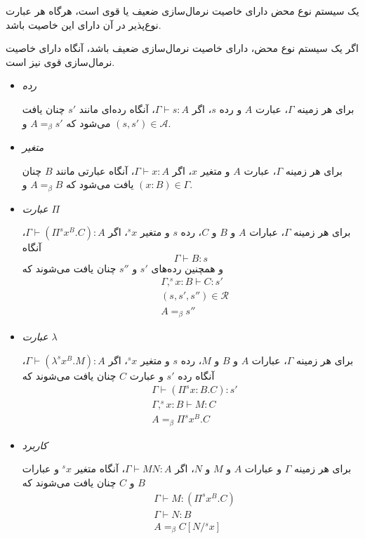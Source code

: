 \begin{defn}
یک سیستم نوع محض دارای خاصیت نرمال‌سازی ضعیف یا قوی است، هرگاه هر عبارت نوع‌پذیر در آن دارای این خاصیت باشد.
\end{defn}

\begin{conj}[\lr{BGK}]\label{BGK}
اگر یک سیستم نوع محض، دارای خاصیت نرمال‌سازی ضعیف باشد، آنگاه دارای خاصیت نرمال‌سازی قوی نیز است.
\end{conj}

\begin{lmm}\label{generation}
\hfill
\begin{itemize}

\item \emph{رده}

برای هر زمینه
$\Gamma$،
عبارت
$A$
و رده
$s$،
اگر
$\Gamma \vdash s : A$،
آنگاه رده‌ای مانند
$s'$
چنان یافت می‌شود که
$A =_\beta s'$
و
$(s,s') \in \mathcal{A}$.

\item \emph{متغیر}

برای هر زمینه
$\Gamma$،
عبارت
$A$
و متغیر
$x$، اگر
$\Gamma \vdash x : A$،
آنگاه عبارتی مانند
$B$
چنان یافت می‌شود که
$A =_\beta B$
و
$(x:B) \in \Gamma$.

\item \emph{عبارت $\Pi$}

برای هر زمینه
$\Gamma$،
عبارات
$A$ و $B$ و $C$،
رده
$s$
و متغیر
${}^sx$،
اگر
$\Gamma \vdash (\Pi ^sx^B.C):A$،
آنگاه
\begin{equation*}
\Gamma \vdash B:s
\end{equation*}
و همچنین رده‌های
$s'$ و $s''$
چنان یافت می‌شوند که
\begin{align*}
&\Gamma,^sx:B \vdash C:s' \\
&(s,s',s'') \in \mathcal{R} \\
&A =_\beta s''
\end{align*}

\item \emph{عبارت $\lambda$}

برای هر زمینه
$\Gamma$،
عبارات
$A$ و $B$ و $M$،
رده
$s$
و متغیر
${}^sx$،
اگر
$\Gamma \vdash (\lambda ^sx^B.M):A$،
آنگاه رده
$s'$
و عبارت
$C$
چنان یافت می‌شوند که
\begin{align*}
&\Gamma \vdash (\Pi ^sx:B.C):s'\\
&\Gamma,^sx:B \vdash M:C\\
&A =_\beta \Pi ^sx^B.C
\end{align*}

\item \emph{کاربرد}

برای هر زمینه
$\Gamma$
و عبارات
$A$ و $M$ و $N$،
اگر
$\Gamma \vdash MN:A$،
آنگاه متغیر
${}^sx$
و عبارات
$B$ و $C$
چنان یافت می‌شوند که
\begin{align*}
&\Gamma \vdash M:(\Pi ^sx^B.C)\\
&\Gamma \vdash N:B\\
&A =_\beta C[N/{}^sx]
\end{align*}
\end{itemize}
\end{lmm}

